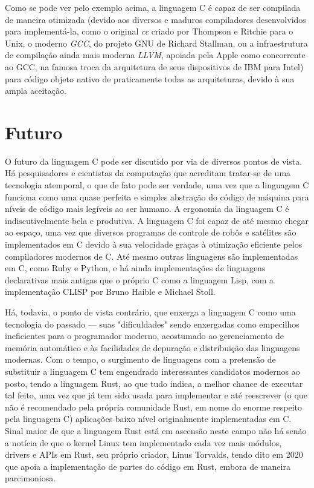 \documentclass[
	12pt,				%
	openright,			%
	twoside,			%
	a4paper,			%
	english,			%
	french,				%
	spanish,			%
	brazil				%
	]{abntex2}
\begin{document}
Como se pode ver pelo exemplo acima, a linguagem C é capaz de ser compilada de maneira otimizada (devido aos diversos e maduros compiladores desenvolvidos para implementá-la, como o original \textit{cc} criado por Thompson e Ritchie para o Unix, o moderno \textit{GCC}, do projeto GNU de Richard Stallman, ou a infraestrutura de compilação ainda mais moderna \textit{LLVM}, apoiada pela Apple como concorrente ao GCC, na famosa troca da arquitetura de seus dispositivos de IBM para Intel) para código objeto nativo de praticamente todas as arquiteturas, devido à sua ampla aceitação. \par


\chapter{Futuro}

O futuro da linguagem C pode ser discutido por via de diversos pontos de vista. Há pesquisadores e cientistas da computação que acreditam tratar-se de uma tecnologia atemporal, o que de fato pode ser verdade, uma vez que a linguagem C funciona como uma quase perfeita e simples abstração do código de máquina para níveis de código mais legíveis ao ser humano. A ergonomia da linguagem C é indiscutivelmente bela e produtiva. A linguagem C foi capaz de até mesmo chegar ao espaço, uma vez que diversos programas de controle de robôs e satélites são implementados em C devido à sua velocidade graças à otimização eficiente pelos compiladores modernos de C. Até mesmo outras linguagens são implementadas em C, como Ruby e Python, e há ainda implementações de linguagens declarativas mais antigas que o próprio C como a linguagem Lisp, com a implementação CLISP por Bruno Haible e Michael Stoll. \par 

Há, todavia, o ponto de vista contrário, que enxerga a linguagem C como uma tecnologia do passado --- suas "dificuldades" sendo enxergadas como empecilhos ineficientes para o programador moderno, acostumado ao gerenciamento de memória automático e às facilidades de depuração e distribuição das linguagens modernas. Com o tempo, o surgimento de linguagens com a pretensão de substituir a linguagem C tem engendrado interessantes candidatos modernos ao posto, tendo a linguagem Rust, ao que tudo indica, a melhor chance de executar tal feito, uma vez que já tem sido usada para implementar e até reescrever (o que não é recomendado pela própria comunidade Rust, em nome do enorme respeito pela linguagem C) aplicações baixo nível originalmente implementadas em C. Sinal maior de que a linguagem Rust está em ascensão neste campo não há senão a notícia de que o kernel Linux tem implementado cada vez mais módulos, drivers e APIs em Rust, seu próprio criador, Linus Torvalds, tendo dito em 2020 que apoia a implementação de partes do código em Rust, embora de maneira parcimoniosa. \par  
\end{document}
